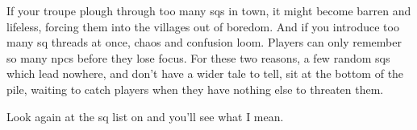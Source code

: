 If your troupe plough through too many \glspl{sq} in town, it might become barren and lifeless, forcing them into the \glspl{village} out of boredom.
And if you introduce too many \gls{sq} threads at once, chaos and confusion loom.
Players can only remember so many \glspl{npc} before they lose focus.
For these two reasons, a few random \glspl{sq} which lead nowhere, and don't have a wider tale to tell, sit at the bottom of the pile, waiting to catch players when they have nothing else to threaten them.

Look again at the \gls{sq} list on  and you'll see what I mean.

